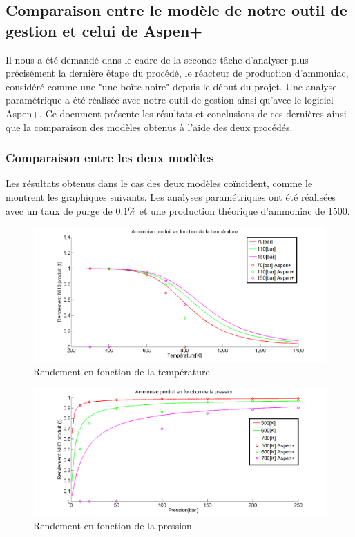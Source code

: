 
\subsection*{Comparaison entre le modèle de notre outil de gestion et celui de Aspen+}
Il nous a été demandé dans le cadre de la seconde tâche d'analyser plus précisément la dernière étape du procédé, le réacteur de production d'ammoniac, considéré comme une "une boîte noire" depuis le début du projet. Une analyse paramétrique a été réalisée avec notre outil de gestion ainsi qu'avec le logiciel Aspen+. Ce document présente les résultats et conclusions de ces dernières ainsi que la comparaison des modèles obtenus à l'aide des deux procédés.


\subsubsection*{Comparaison entre les deux modèles}
Les résultats obtenus dans le cas des deux modèles coïncident, comme le montrent les graphiques suivants. Les analyses paramétriques ont été réalisées avec un taux de purge de 0.1\% et une production théorique d'ammoniac de \unit{1500}{\tonne}.

\begin{figure}[ht!]
 \centering
 \includegraphics[scale=0.4]{GrapheCompT.png}
 \caption{Rendement en fonction de la température}
 \label{scheme}
\end{figure}

\begin{figure}[ht!]
 \centering
 \includegraphics[scale=0.4]{GrapheCompP.png}
 \caption{Rendement en fonction de la pression}
 \label{scheme}
\end{figure}


